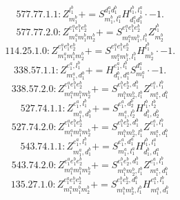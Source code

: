 \documentclass[letterpaper,10pt,fleqn,leqno,onecolumn]{article}
\begin{document}
\begin{equation} \;\;\;\;\;\;  577.77.1.1: Z^{l_{1}^{b}}_{m_{1}^{b}}+=S^{d_{1}^{a}d_{1}^{b}}_{m_{1}^{b},l_{1}^{a}}H^{l_{1}^{b},l_{1}^{a}}_{d_{1}^{a}d_{1}^{b}}\cdot -1. \end{equation}
\begin{equation} \;\;\;\;\;\;  577.77.2.0: Z^{e_{1}^{a}e_{1}^{b}e_{2}^{b}}_{m_{1}^{a}m_{1}^{b}m_{2}^{b}}+=S^{e_{1}^{a}e_{1}^{b}e_{2}^{b}}_{m_{1}^{a}m_{1}^{b},l_{1}^{b}}Z^{l_{1}^{b}}_{m_{2}^{b}} \end{equation}
\begin{equation} \;\;\;\;\;\;  114.25.1.0: Z^{e_{1}^{a}e_{1}^{b}e_{2}^{b}}_{m_{1}^{a}m_{1}^{b}m_{2}^{b}}+=S^{e_{1}^{a}e_{1}^{b}e_{2}^{b}}_{m_{1}^{a}m_{1}^{b},l_{1}^{b}}H^{l_{1}^{b}}_{m_{2}^{b}}\cdot -1. \end{equation}
\begin{equation} \;\;\;\;\;\;  338.57.1.1: Z^{e_{1}^{a},l_{1}^{b}}_{m_{1}^{a},d_{1}^{b}}+=H^{e_{1}^{a},l_{1}^{b}}_{d_{1}^{b},d_{1}^{a}}S^{d_{1}^{a}}_{m_{1}^{a}}\cdot -1. \end{equation}
\begin{equation} \;\;\;\;\;\;  338.57.2.0: Z^{e_{1}^{a}e_{1}^{b}e_{2}^{b}}_{m_{1}^{a}m_{1}^{b}m_{2}^{b}}+=S^{e_{1}^{b}e_{2}^{b},d_{1}^{b}}_{m_{1}^{b}m_{2}^{b},l_{1}^{b}}Z^{e_{1}^{a},l_{1}^{b}}_{m_{1}^{a},d_{1}^{b}} \end{equation}
\begin{equation} \;\;\;\;\;\;  527.74.1.1: Z^{e_{1}^{a},l_{1}^{b}}_{m_{1}^{a},d_{1}^{b}}+=S^{e_{1}^{a},d_{2}^{b}}_{m_{1}^{a},l_{2}^{b}}H^{l_{1}^{b},l_{2}^{b}}_{d_{1}^{b},d_{2}^{b}} \end{equation}
\begin{equation} \;\;\;\;\;\;  527.74.2.0: Z^{e_{1}^{a}e_{1}^{b}e_{2}^{b}}_{m_{1}^{a}m_{1}^{b}m_{2}^{b}}+=S^{e_{1}^{b}e_{2}^{b},d_{1}^{b}}_{m_{1}^{b}m_{2}^{b},l_{1}^{b}}Z^{e_{1}^{a},l_{1}^{b}}_{m_{1}^{a},d_{1}^{b}} \end{equation}
\begin{equation} \;\;\;\;\;\;  543.74.1.1: Z^{e_{1}^{a},l_{1}^{b}}_{m_{1}^{a},d_{1}^{b}}+=S^{e_{1}^{a},d_{1}^{a}}_{m_{1}^{a},l_{1}^{a}}H^{l_{1}^{b},l_{1}^{a}}_{d_{1}^{b},d_{1}^{a}} \end{equation}
\begin{equation} \;\;\;\;\;\;  543.74.2.0: Z^{e_{1}^{a}e_{1}^{b}e_{2}^{b}}_{m_{1}^{a}m_{1}^{b}m_{2}^{b}}+=S^{e_{1}^{b}e_{2}^{b},d_{1}^{b}}_{m_{1}^{b}m_{2}^{b},l_{1}^{b}}Z^{e_{1}^{a},l_{1}^{b}}_{m_{1}^{a},d_{1}^{b}} \end{equation}
\begin{equation} \;\;\;\;\;\;  135.27.1.0: Z^{e_{1}^{a}e_{1}^{b}e_{2}^{b}}_{m_{1}^{a}m_{1}^{b}m_{2}^{b}}+=S^{e_{1}^{b}e_{2}^{b},d_{1}^{b}}_{m_{1}^{b}m_{2}^{b},l_{1}^{b}}H^{e_{1}^{a},l_{1}^{b}}_{m_{1}^{a},d_{1}^{b}} \end{equation}
\end{document}
